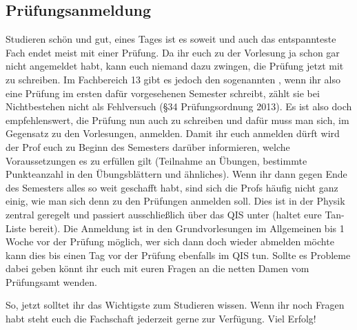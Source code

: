 \subsection{Prüfungsanmeldung}
\label{subsec:prüfungsanmeldung}
Studieren schön und gut, eines Tages ist es soweit und auch das entspannteste Fach endet meist mit einer Prüfung. Da ihr euch zu der Vorlesung ja schon gar nicht angemeldet habt, kann euch niemand dazu zwingen, die Prüfung jetzt mit zu schreiben. Im Fachbereich 13 gibt es jedoch den sogenannten , wenn ihr also eine Prüfung im ersten dafür vorgesehenen Semester schreibt, zählt sie bei Nichtbestehen nicht als Fehlversuch (\S 34 Prüfungsordnung 2013). Es ist also doch empfehlenswert, die Prüfung nun auch zu schreiben und dafür muss man sich, im Gegensatz zu den Vorlesungen, anmelden. Damit ihr euch anmelden dürft wird der Prof euch zu Beginn des Semesters darüber informieren, welche Voraussetzungen es zu erfüllen gilt (Teilnahme an Übungen, bestimmte Punkteanzahl in den Übungsblättern und ähnliches). Wenn ihr dann gegen Ende des Semesters alles so weit geschafft habt, sind sich die Profs häufig nicht ganz einig, wie man sich denn zu den Prüfungen anmelden soll. Dies ist in der Physik zentral geregelt und passiert ausschließlich über das QIS unter  (haltet eure Tan-Liste bereit). Die Anmeldung ist in den Grundvorlesungen im Allgemeinen bis 1 Woche vor der Prüfung möglich, wer sich dann doch wieder abmelden möchte kann dies bis einen Tag vor der Prüfung ebenfalls im QIS tun. Sollte es Probleme dabei geben könnt ihr euch mit euren Fragen an die netten Damen vom Prüfungsamt wenden.\\
\par
So, jetzt solltet ihr das Wichtigste zum Studieren wissen. Wenn ihr noch Fragen habt steht euch die Fachschaft jederzeit gerne zur Verfügung. Viel Erfolg!
